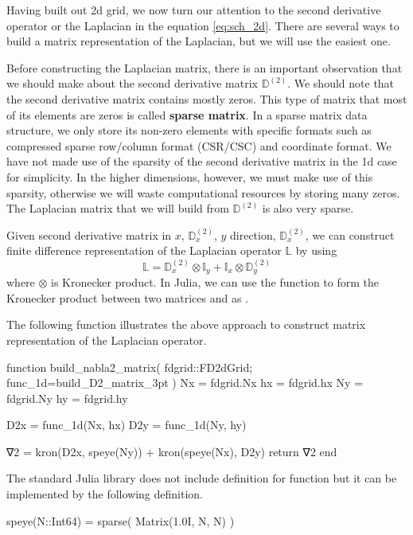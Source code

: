 Having built out 2d grid, we now turn our attention to the second derivative operator or
the Laplacian in the equation \ref{eq:sch_2d}.
There are several ways to build a matrix representation of the Laplacian, but we will
use the easiest one. 

Before constructing the Laplacian matrix, there is an important observation that
we should make about the second derivative matrix $\mathbb{D}^{(2)}$. We should note
that the second derivative matrix contains mostly zeros. This type of matrix that
most of its elements are zeros is called \textbf{sparse matrix}.
In a sparse matrix data structure, we only store its non-zero elements with specific
formats such as compressed sparse row/column format (CSR/CSC) and coordinate format.
We have not made use of the sparsity of the second derivative matrix
in the 1d case for simplicity. In the higher dimensions, however,
we must make use of this sparsity, otherwise we will waste computational resources 
by storing many zeros. The Laplacian matrix that we will build from
$\mathbb{D}^{(2)}$ is also very sparse.

Given second derivative matrix in $x$, $\mathbb{D}^{(2)}_{x}$,
$y$ direction, $\mathbb{D}^{(2)}_{x}$,
we can construct finite difference representation of the Laplacian operator
$\mathbb{L}$ by using
%
\begin{equation}
\mathbb{L} = \mathbb{D}^{(2)}_{x} \otimes \mathbb{I}_{y} +
\mathbb{I}_{x} \otimes \mathbb{D}^{(2)}_{y}
\end{equation}
%
where $\otimes$ is Kronecker product.
In Julia, we can use the function  to form the Kronecker product
between two matrices  and  as .

The following function illustrates the above approach to construct matrix
representation of the Laplacian operator.
\begin{juliacode}
function build_nabla2_matrix( fdgrid::FD2dGrid; func_1d=build_D2_matrix_3pt )
  Nx = fdgrid.Nx
  hx = fdgrid.hx
  Ny = fdgrid.Ny
  hy = fdgrid.hy
    
  D2x = func_1d(Nx, hx)
  D2y = func_1d(Ny, hy)

  ∇2 = kron(D2x, speye(Ny)) + kron(speye(Nx), D2y)
  return ∇2
end
\end{juliacode}

The standard Julia library does not include definition for  function
but it can be implemented by the following definition.
\begin{juliacode}
speye(N::Int64) = sparse( Matrix(1.0I, N, N) )
\end{juliacode}

